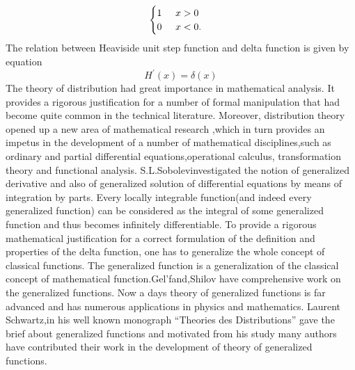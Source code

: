 \begin{large}
\begin{align*}
\begin{cases}
  1\hspace{0.5cm}  x>0 \\
  0\hspace{0.5cm} x<0.
  \end{cases}
 \end{align*}
The relation between Heaviside unit step function and delta function is given by equation
\begin{equation}
H^{\prime}(x)=\delta(x)
\end{equation}
The theory of distribution had great importance in mathematical analysis. It provides a rigorous justification for a number of formal manipulation that had become quite common in the technical literature.  Moreover, distribution theory opened up a new area of mathematical research ,which in turn provides an impetus in the development of a number of mathematical disciplines,such as ordinary and partial differential equations,operational calculus, transformation theory and functional analysis. S.L.Sobolev\cite{R71}investigated the notion of generalized derivative and also of generalized solution of differential equations by means of integration by parts. Every locally integrable function(and indeed every generalized function) can be considered as the integral of some generalized function and thus becomes infinitely differentiable. To provide a rigorous mathematical justification for a correct formulation of the definition and properties of the delta function, one has to generalize the whole concept of classical functions. The generalized function is a generalization of the classical concept of mathematical function.Gel'fand,Shilov\cite{R38,R39} have comprehensive work on the generalized functions. Now a days theory of generalized functions is far advanced and has numerous applications in physics and mathematics. Laurent Schwartz\cite{R72,R73},in his well known monograph “Theories des Distributions” gave the brief about generalized functions and motivated from his study many authors have contributed their work in the development of theory of generalized functions.


\end{large}
